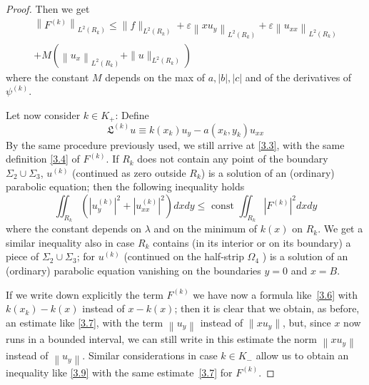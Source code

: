 \documentclass[a4paper,12pt,leqno]{article}
\numberwithin{equation}{section}
\begin{document}
\begin{proof}
\newpage

Then we get
\begin{equation} \label{3.7}
	\begin{split}
		\left\|F^{(k)}\right\|_{L^{2}\left(R_{k}\right)} \leqslant\|f\|_{L^{2}\left(R_{k}\right)}+\varepsilon\left\|x u_{y}\right\|_{L^{2}\left(R_{k}\right)}+\varepsilon\left\|u_{x x}\right\|_{L^{2}\left(R_{k}\right)}\\
		+M\left(\left\|u_{x}\right\|_{L^{2}\left(R_{k}\right)}+\|u\|_{L^{2}\left(R_{k}\right)}\right)
	\end{split}
\end{equation}
where the constant $M$ depends on the max of $a,|b|,|c|$ and of the derivatives of $\psi^{(k)}$.

Let now consider $k \in K_{+}$: Define
\begin{equation} \label{3.8}
	\mathfrak{L}^{(k)} u \equiv k\left(x_{k}\right) u_{y}-a\left(x_{k}, y_{k}\right) u_{xx}
\end{equation}
By the same procedure previously used, we still arrive at \cref{3.3}, with the same definition \eqref{3.4} of $F^{(k)}$. If $R_{k}$ does not contain any point of the boundary $\Sigma_{2} \cup \Sigma_{3}$, $u^{(k)}$ (continued as zero outside $R_{k}$) is a solution of an (ordinary) parabolic equation; then the following inequality holds
\begin{equation} \label{3.9}
	\iint_{R_{k}}\left(\left|u_{y}^{(k)}\right|^{2}+\left|u_{xx}^{(k)}\right|^{2}\right) d x d y \leqslant \text { const } \iint_{R_{k}}\left|F^{(k)}\right|^{2} d x d y
\end{equation}
where the constant depends on $\lambda$ and on the minimum of $k(x)$ on $R_{k}$. We get a similar inequality also in case $R_{k}$ contains (in its interior or on its boundary) a piece of $\Sigma_{2} \cup \Sigma_{3}$; for $u^{(k)}$ (continued on the half-strip $\Omega_{4}$ ) is a solution of an (ordinary) parabolic equation vanishing on the boundaries $y=0$ and $x=B$.

If we write down explicitly the term $F^{(k)}$ we have now a formula like~\eqref{3.6} with $k\left(x_{k}\right)-k(x)$ instead of $x-k(x)$; then it is clear that we obtain, as before, an estimate like \eqref{3.7}, with the term $\left\|u_{y}\right\|$ instead of $\|x u_y\|$, but, since $x$ now runs in a bounded interval, we can still write in this estimate the norm $\left\|x u_{y}\right\|$ instead of $\left\|u_{y}\right\|$. Similar considerations in case $k \in K_-$ allow us to obtain an inequality like \eqref{3.9} with the same estimate~\eqref{3.7} for $F^{(k)}$.


\end{proof}
\end{document}
